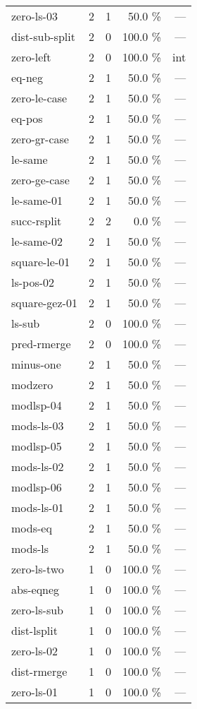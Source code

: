 \documentclass[a4paper]{article}
\begin{document}
\begin{supertabular}{l|r|r|r|r}
zero-ls-03 & 2 & 1 & 50.0 \% & ---\\
dist-sub-split & 2 & 0 & 100.0 \% & ---\\
zero-left & 2 & 0 & 100.0 \% & int\\
eq-neg & 2 & 1 & 50.0 \% & ---\\
zero-le-case & 2 & 1 & 50.0 \% & ---\\
eq-pos & 2 & 1 & 50.0 \% & ---\\
zero-gr-case & 2 & 1 & 50.0 \% & ---\\
le-same & 2 & 1 & 50.0 \% & ---\\
zero-ge-case & 2 & 1 & 50.0 \% & ---\\
le-same-01 & 2 & 1 & 50.0 \% & ---\\
succ-rsplit & 2 & 2 & 0.0 \% & ---\\
le-same-02 & 2 & 1 & 50.0 \% & ---\\
square-le-01 & 2 & 1 & 50.0 \% & ---\\
ls-pos-02 & 2 & 1 & 50.0 \% & ---\\
square-gez-01 & 2 & 1 & 50.0 \% & ---\\
ls-sub & 2 & 0 & 100.0 \% & ---\\
pred-rmerge & 2 & 0 & 100.0 \% & ---\\
minus-one & 2 & 1 & 50.0 \% & ---\\
modzero & 2 & 1 & 50.0 \% & ---\\
modlsp-04 & 2 & 1 & 50.0 \% & ---\\
mods-ls-03 & 2 & 1 & 50.0 \% & ---\\
modlsp-05 & 2 & 1 & 50.0 \% & ---\\
mods-ls-02 & 2 & 1 & 50.0 \% & ---\\
modlsp-06 & 2 & 1 & 50.0 \% & ---\\
mods-ls-01 & 2 & 1 & 50.0 \% & ---\\
mods-eq & 2 & 1 & 50.0 \% & ---\\
mods-ls & 2 & 1 & 50.0 \% & ---\\
zero-ls-two & 1 & 0 & 100.0 \% & ---\\
abs-eqneg & 1 & 0 & 100.0 \% & ---\\
zero-ls-sub & 1 & 0 & 100.0 \% & ---\\
dist-lsplit & 1 & 0 & 100.0 \% & ---\\
zero-ls-02 & 1 & 0 & 100.0 \% & ---\\
dist-rmerge & 1 & 0 & 100.0 \% & ---\\
zero-ls-01 & 1 & 0 & 100.0 \% & ---\\

\end{supertabular}
\end{document}

